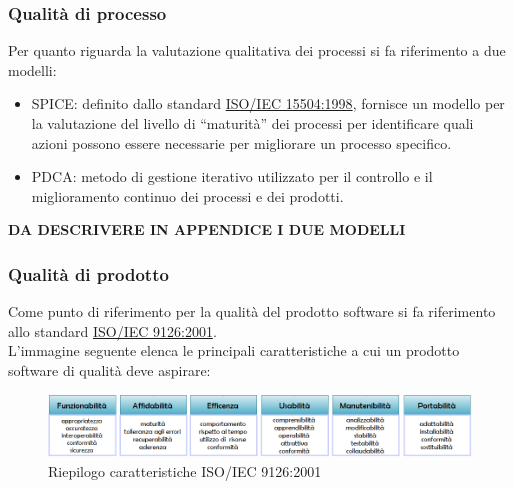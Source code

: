 \documentclass[a4paper,11pt]{article}
\begin{document}
\subsubsection{Qualità di processo}
Per quanto riguarda la valutazione qualitativa dei processi si fa riferimento a due modelli: 
\begin{itemize}
\item SPICE\addglos : definito dallo standard \underline{ISO/IEC 15504:1998}, fornisce un modello per la valutazione del livello di “maturità”
dei processi per identificare quali azioni possono essere necessarie per migliorare un processo specifico.
\item PDCA\addglos : metodo di gestione iterativo utilizzato per il controllo e il miglioramento continuo dei processi e dei prodotti. 
\end{itemize}

\textbf{DA DESCRIVERE IN APPENDICE I DUE MODELLI}
\subsubsection{Qualità di prodotto}
Come punto di riferimento per la qualità del prodotto software si fa riferimento allo standard \underline{ISO/IEC 9126:2001}.\\
L'immagine seguente elenca le principali caratteristiche a cui un prodotto software di qualità deve aspirare:\\
\begin{figure}[h!]
\centering
\includegraphics[scale=0.55]{../images/ISO-9126-cut}
\caption{Riepilogo caratteristiche ISO/IEC 9126:2001}
\end{figure}
\end{document}
